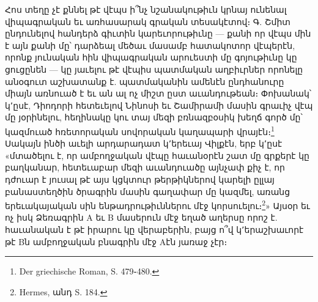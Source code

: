 \documentclass{article}
\begin{document}
{Հոս տեղը չէ քննել թէ վէպս ի՞նչ նշանակութիւն կրնայ ունենալ վիպագրական եւ առհասարակ գրական տեսակէտով։ Գ. Շմիտ ընդունելով հանդերձ գիւտին կարեւորութիւնը — քանի որ վէպս մին է այն քանի մը՝ դարձեալ մեծաւ մասամբ հատակոտոր վէպերէն, որոնք յունական հին վիպագրական արուեստի մը գոյութիւնը կը ցուցընեն — կը յաւելու թէ վէպիս պատմական աղբիւրներ որոնելը անօգուտ աշխատանք է. պատմականին ամենէն ընդհանուրը միայն առնուած է եւ ան ալ ոչ միշտ ըստ աւանդութեան։ Փոխանակ՝ կ՚ըսէ, Դիոդորի հետեւելով Նինոսի եւ Շամիրամի մասին գրաւիչ վէպ մը յօրինելու, հեղինակը կու տայ մեզի բռնազբօսիկ խեղճ գործ մը՝ կազմուած հռետորական սովորական կաղապարի վրայէն։\footnote{Der griechische Roman, S. 479֊480.} Սակայն ինծի աւելի արդարադատ կ՚երեւայ Վիլքէն, երբ կ՚ըսէ «մտածելու է, որ ամբողջական վէպը հաւանօրէն շատ մը գրքերէ կը բաղկանար, հետեւաբար մեզի աւանդուածը այնչափ քիչ է, որ դժուար է յուսալ թէ այս կցկտուր թերթիկներով կարելի ըլլայ բանաստեղծին ծրագրին մասին գաղափար մը կազմել, առանց երեւակայական սին ենթադրութիւններու մէջ կորսուելու։\footnote{Hermes, անդ S. 184.}» Այսօր եւ ոչ իսկ Ձեռագրին Α եւ Β մասերուն մէջ եղած աղերսը որոշ է. հաւանական է թէ իրարու կը վերաբերին, բայց ո՞վ կ՚երաշխաւորէ թէ Βն ամբողջական բնագրին մէջ Αէն յառաջ չէր։

}
\end{document}
